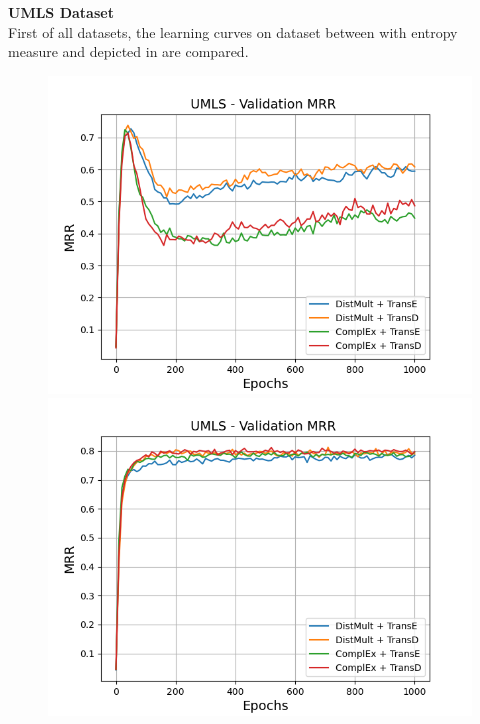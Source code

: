 \textbf{UMLS Dataset}
\label{subsubsec:uncertainty_umls}\\
%
First of all datasets, the learning curves on \umls dataset between \ussoftmax with entropy measure and \origsampling depicted in  are compared.
\begin{figure}[H]
    \centering
    \begin{minipage}{.5\textwidth}
      \centering
      \includegraphics[width=0.9\linewidth]{figures/results/gan_train/not_pretrained/random/umls/epochs1000/random_umls_mrrs.png}
    \end{minipage}%
    \begin{minipage}{.5\textwidth}
      \centering
      \includegraphics[width=0.9\linewidth]{figures/results/gan_train/not_pretrained/uncertainty/max_distribution/entropy/umls/1k_epochs/uncertainty_umls_mrrs.png}

\end{minipage}
\end{figure}
